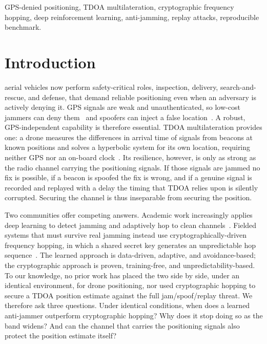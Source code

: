 \documentclass[journal]{IEEEtran}
\begin{document}
\begin{IEEEkeywords}
GPS-denied positioning, TDOA multilateration, cryptographic frequency hopping,
deep reinforcement learning, anti-jamming, replay attacks, reproducible
benchmark.
\end{IEEEkeywords}

\section{Introduction}\label{sec:intro}
 aerial vehicles now perform safety-critical roles,
inspection, delivery, search-and-rescue, and defense, that demand reliable
positioning even when an adversary is actively denying it. GPS signals are weak
and unauthenticated, so low-cost jammers can deny them~\cite{ref18} and
spoofers can inject a false location~\cite{ref24,ref25,ref19}. A robust,
GPS-independent capability is therefore essential. TDOA multilateration
provides one: a drone measures the differences in arrival time of signals from
beacons at known positions and solves a hyperbolic system for its own location,
requiring neither GPS nor an on-board clock~\cite{ref6,ref8,ref30}. Its
resilience, however, is only as strong as the radio channel carrying the
positioning signals. If those signals are jammed no fix is possible, if a
beacon is spoofed the fix is wrong, and if a genuine signal is recorded and
replayed with a delay the timing that TDOA relies upon is silently corrupted.
Securing the channel is thus inseparable from securing the position.

Two communities offer competing answers. Academic work increasingly applies
deep learning to detect jamming and adaptively hop to clean
channels~\cite{ref11,ref12,ref13,ref31}. Fielded systems that must survive real
jamming instead use cryptographically-driven frequency hopping, in which a
shared secret key generates an unpredictable hop
sequence~\cite{ref1,ref2,ref17}. The learned approach is data-driven, adaptive,
and avoidance-based; the cryptographic approach is proven, training-free, and
unpredictability-based. To our knowledge, no prior work has placed the two
side by side, under an identical environment, for drone positioning, nor used
cryptographic hopping to secure a TDOA position estimate against the full
jam/spoof/replay threat. We therefore ask three questions. Under identical
conditions, when does a learned anti-jammer outperform cryptographic hopping?
Why does it stop doing so as the band widens? And can the channel that carries
the positioning signals also protect the position estimate itself?
\end{document}
